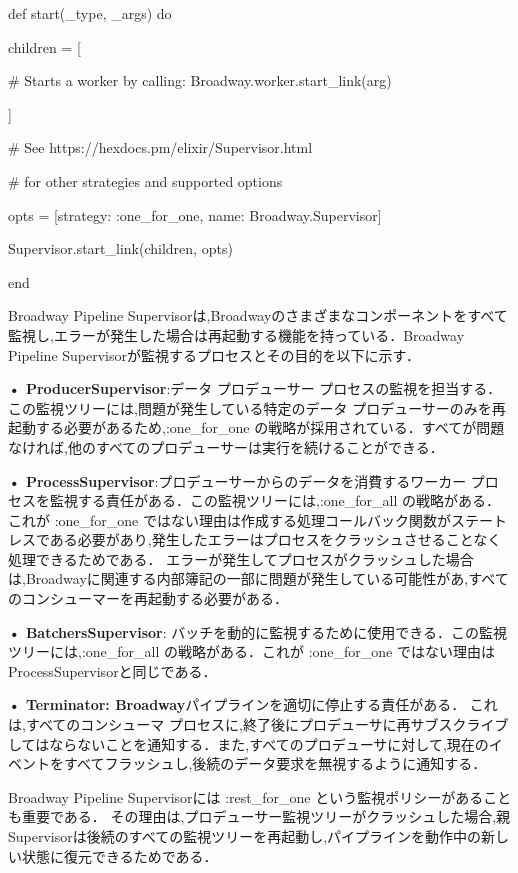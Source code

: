 \documentclass[a4paper]{jreport}	%
\begin{document}
def start(\_type, \_args) do 

children = [

    \# Starts a worker by calling: Broadway.worker.start\_link(arg)
    
    
]

 \# See https://hexdocs.pm/elixir/Supervisor.html

 \# for other strategies and supported options

opts = [strategy: :one\_for\_one, name: Broadway.Supervisor] 

Supervisor.start\_link(children, opts)

end

Broadway Pipeline Supervisorは,Broadwayのさまざまなコンポーネントをすべて監視し,エラーが発生した場合は再起動する機能を持っている．Broadway Pipeline Supervisorが監視するプロセスとその目的を以下に示す．

\textbf{• ProducerSupervisor}:データ プロデューサー プロセスの監視を担当する． この監視ツリーには,問題が発生している特定のデータ プロデューサーのみを再起動する必要があるため,:one\_for\_one の戦略が採用されている．すべてが問題なければ,他のすべてのプロデューサーは実行を続けることができる．

\textbf{• ProcessSupervisor}:プロデューサーからのデータを消費するワーカー プロセスを監視する責任がある．この監視ツリーには,:one\_for\_all の戦略がある．これが :one\_for\_one ではない理由は作成する処理コールバック関数がステートレスである必要があり,発生したエラーはプロセスをクラッシュさせることなく処理できるためである． エラーが発生してプロセスがクラッシュした場合は,Broadwayに関連する内部簿記の一部に問題が発生している可能性があ,すべてのコンシューマーを再起動する必要がある．

\textbf{• BatchersSupervisor}: バッチを動的に監視するために使用できる．この監視ツリーには,:one\_for\_all の戦略がある．これが :one\_for\_one ではない理由はProcessSupervisorと同じである．

\textbf{• Terminator: Broadway}パイプラインを適切に停止する責任がある． これは,すべてのコンシューマ プロセスに,終了後にプロデューサに再サブスクライブしてはならないことを通知する．また,すべてのプロデューサに対して,現在のイベントをすべてフラッシュし,後続のデータ要求を無視するように通知する．

Broadway Pipeline Supervisorには :rest\_for\_one という監視ポリシーがあることも重要である． その理由は,プロデューサー監視ツリーがクラッシュした場合,親Supervisorは後続のすべての監視ツリーを再起動し,パイプラインを動作中の新しい状態に復元できるためである．
\end{document}
